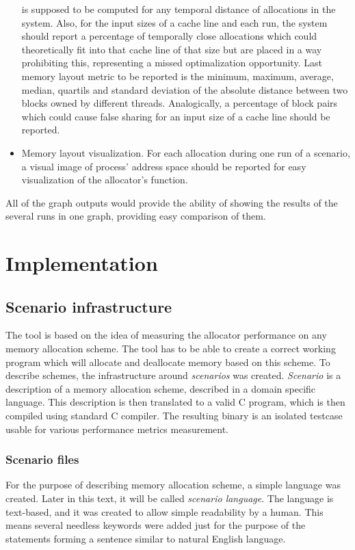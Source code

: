 \begin{itemize}
is supposed to be computed for any temporal distance of allocations in the
system. Also, for the input sizes of a cache line and each run, the system should
report a percentage of temporally close allocations which could theoretically fit
into that cache line of that size but are placed in a way prohibiting this,
representing a missed optimalization opportunity. Last memory layout metric to be
reported is the minimum, maximum, average, median, quartils and standard
deviation of the absolute distance between two blocks owned by different threads.
Analogically, a percentage of block pairs which could cause false sharing for an
input size of a cache line should be reported. \item Memory layout visualization.
For each allocation during one run of a scenario, a visual image of process'
address space should be reported for easy visualization of the allocator's
function.
\end{itemize}

All of the graph outputs would provide the ability of showing the results of the
several runs in one graph, providing easy comparison of them.

\section{Implementation}
\subsection{Scenario infrastructure}
The tool is based on the idea of measuring the allocator performance on any
memory allocation scheme. The tool has to be able to create a correct working
program which will allocate and deallocate memory based on this scheme. To
describe schemes, the infrastructure around {\em scenarios} was created.
{\em Scenario} is a description of a memory allocation scheme, described in a
domain specific language. This description is then translated to a valid C
program, which is then compiled using standard C compiler. The resulting binary
is an isolated testcase usable for various performance metrics measurement. 
\subsubsection{Scenario files}
For the purpose of describing memory allocation scheme, a simple language was
created. Later in this text, it will be called {\em scenario language}. The
language is text-based, and it was created to allow simple readability by a
human. This means several needless keywords were added just for the purpose of
the statements forming a sentence similar to natural English language.

